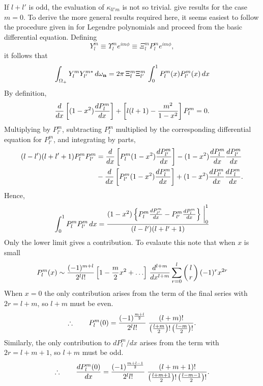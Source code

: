 If $l+l'$ is odd, the evaluation of $\kappa_{ll'm}$ is not so trivial. 
\cite{Dave74} give results for the case $m=0$. To derive the more general
results required here, it seems easiest to follow the procedure given in
\cite{Copson} for Legendre polynomials and proceed from the basic 
differential equation. Defining
\begin{equation}
Y_l^m \equiv \Upsilon_l^m e^{im\phi} \equiv \Xi_l^m P_l^m e^{im\phi},
\end{equation}
it follows that
\begin{equation}
\int_{\Omega_+} Y_l^m Y_{l'}^{m*} \, d\omega_{\mathbf{n}} =
2\pi \, \Xi_l^m \Xi_{l'}^m \, \int_0^1 P_l^m(x) P_{l'}^m(x) \, dx
\end{equation}
By definition,
\begin{equation}
{d\over{dx}} \left [ (1-x^2) {{dP_l^m}\over{dx}} \right ] +
\left [ l(l+1) - {m^2 \over {1-x^2}} \right ] P_l^m =0.
\end{equation}
Multiplying by $P_{l'}^m$, subtracting $P_l^m$ multiplied by the
corresponding differential equation for $P_{l'}^m$, and integrating
by parts,
\begin{equation}
\begin{split}
(l-l')(l+l'+1) P_l^m P_{l'}^m &= {d\over{dx}} \left [
P_l^m (1-x^2) {{dP_{l'}^m}\over{dx}} \right ] - (1-x^2) {{dP_l^m}\over{dx}}
{{dP_{l'}^m}\over{dx}} \\
&- {d\over{dx}} \left [P_{l'}^m (1-x^2) {{dP_l^m}\over{dx}} \right ]
+(1-x^2) {{dP_{l'}^m}\over{dx}} {{dP_l^m}\over{dx}}.
\end{split}
\end{equation}
Hence,
\begin{equation}
\int_0^1 P_l^m P_{l'}^m \, dx = {{  (1-x^2) \left \{ P_l^m { { dP_{l'}^m}
\over {dx} } - P_{l'}^m { { dP_l^m}\over {dx} } \right \} \biggm |_0^1}
\over {(l-l')(l+l'+1)}}
\end{equation}
Only the lower limit gives a contribution. To evalaute this note that when
$x$ is small
\begin{equation}
P_l^m (x) \sim {{(-1)^{m+l}}\over {2^l l!}} \left [ 1 -{m\over 2} x^2 +
\ldots \right ] \, {d^{l+m}\over{dx^{l+m}}} \sum_{r=0}^l 
\left ( {l \atop r} \right ) (-1)^r x^{2r}
\end{equation}
When $x=0$ the only contribution arises from the term of the final series
with $2r=l+m$, so $l+m$ must be even. 
\begin{equation}
\therefore\qquad P_l^m (0) = { { (-1)^{{m+l}\over 2} } \over { 2^l l!}} \;
{ {(l+m)!} \over { \left ( {{l+m}\over 2} \right )! \left ( {{l-m}\over 2} 
\right )! } }.
\end{equation}
Similarly, the only contribution to $dP_l^m/dx$ arises
from the term with $2r=l+m+1$, so $l+m$ must be odd.
\begin{equation}
\therefore\qquad {{dP_l^m (0)}\over{dx}} = { { (-1)^{{m+l-1}\over 2} } 
\over { 2^l l!} } \;
{ {(l+m+1)!} \over { \left ( {{l+m+1}\over 2} \right )! 
\left ( {{l-m-1}\over 2} \right )! } }.
\end{equation}

